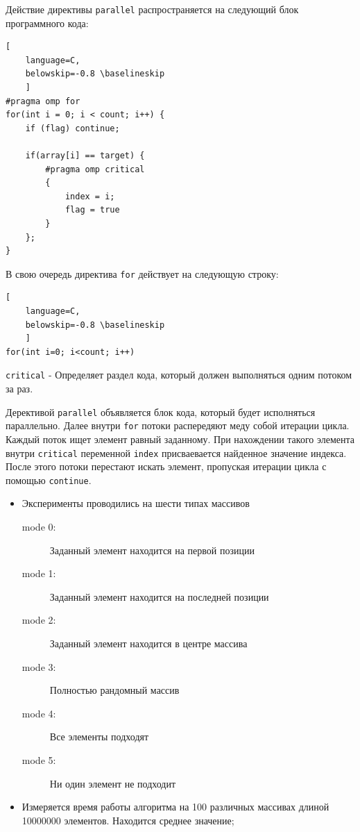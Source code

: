 Действие директивы \verb|parallel| распространяется на следующий блок программного кода:

\begin{lstlisting}[
    language=C,
    belowskip=-0.8 \baselineskip
    ]
#pragma omp for
for(int i = 0; i < count; i++) {
    if (flag) continue;

    if(array[i] == target) {
        #pragma omp critical
        {
            index = i;
            flag = true
        }
    };
}
\end{lstlisting}

\vspace{10mm}
В свою очередь директива \verb|for| действует на следующую строку:

\begin{lstlisting}[
    language=C,
    belowskip=-0.8 \baselineskip
    ]
for(int i=0; i<count; i++)
\end{lstlisting}

\vspace{10mm}
\verb|critical| - Определяет раздел кода, который должен выполняться одним потоком за раз.


Дерективой \verb|parallel| объявляется блок кода, который будет исполняться параллельно. Далее внутри \verb|for| потоки распередяют меду собой итерации цикла. Каждый поток ищет элемент равный заданному. При нахождении такого элемента внутри \verb|critical| переменной \verb|index| присваевается найденное значение индекса. После этого потоки перестают искать элемент, пропуская итерации цикла с помощью \verb|continue|.

\newpage



\begin{itemize}
    \item Эксперименты проводились на шести типах массивов

\begin{description}
    \item[mode 0:] Заданный элемент находится на первой позиции
    \item[mode 1:] Заданный элемент находится на последней позиции
    \item[mode 2:] Заданный элемент находится в центре массива
    \item[mode 3:] Полностью рандомный массив
    \item[mode 4:] Все элементы подходят
    \item[mode 5:] Ни один элемент не подходит
\end{description}

    \item Измеряется время работы алгоритма на 100 различных массивах длиной 10\hspace{1mm}000\hspace{1mm}000 элементов. Находится среднее значение;
\end{itemize}

